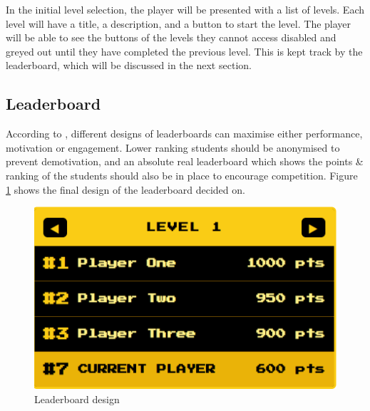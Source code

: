 In the initial level selection, the player will be presented with a list of levels. Each level will have a title, a description, and a button to start the level. The player will be able to see the buttons of the levels they cannot access disabled and greyed out until they have completed the previous level. This is kept track by the leaderboard, which will be discussed in the next section.

\subsection{Leaderboard}
According to \cite{https://doi.org/10.1111/jcal.13077}, different designs of leaderboards can maximise either performance, motivation or engagement. Lower ranking students should be anonymised to prevent demotivation, and an absolute real leaderboard which shows the points & ranking of the students should also be in place to encourage competition. Figure \ref{fig:leaderboard} shows the final design of the leaderboard decided on.

\begin{figure}[H]
    \centering
    \includegraphics[width=0.5\linewidth]{images/leaderboard.png}
    \caption{Leaderboard design}    
    \label{fig:leaderboard}
\end{figure}

